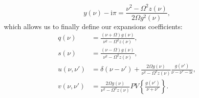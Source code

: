 \begin{equation}
y(\nu) - \mathrm{i}\pi = \frac{\nu^2 - \Omega^2z(\nu)}{2\Omega g^2(\nu)},
\end{equation}
which allows us to finally define our expansions coefficients:
\begin{equation}
\begin{split}
q(\nu) &= \frac{(\nu + \Omega)g(\nu)}{\nu^2 - \Omega^2 z(\nu)},\\
s(\nu) &= \frac{(\nu - \Omega)g(\nu)}{\nu^2 - \Omega^2 z(\nu)},\\
u(\nu,\nu') &= \delta(\nu - \nu') + \frac{2\Omega g(\nu)}{\nu^2 - \Omega^2z(\nu)}\frac{g(\nu')}{\nu - \nu' - \mathrm{i}\epsilon},\\
v(\nu,\nu') &= \frac{2\Omega g(\nu)}{\nu^2 - \Omega^2z(\nu)}PV\left\{\frac{g(\nu')}{\nu + \nu'}\right\}.
\end{split}
\end{equation}


